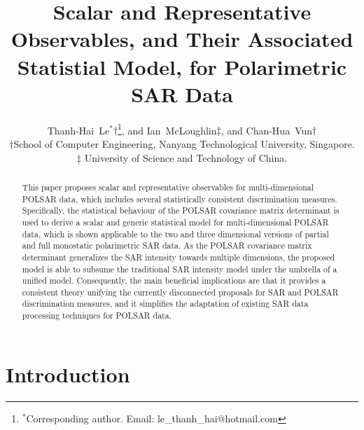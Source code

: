 \documentclass[printer]{tRSL2e}
\title{
  Scalar and Representative Observables, and Their Associated Statistial Model, for Polarimetric SAR Data
}
\begin{document}
\author{
  Thanh-Hai~Le$^{\ast}$$\dag$\thanks{$^\ast$Corresponding
author. Email: le\_thanh\_hai@hotmail.com \vspace{6pt}},
  and Ian~McLoughlin${\ddag}$, 
  and Chan-Hua~Vun${\dag}$\\
\vspace{6pt} $\dag$School of Computer Engineering, Nanyang Technological University, Singapore.\\
$\ddag$ University of Science and Technology of China.\\
\vspace{6pt} }

\maketitle

\begin{abstract}
This paper proposes scalar and representative observables for multi-dimensional POLSAR data,
  which includes several statistically consistent discrimination measures. %
Specifically, the statistical behaviour of the POLSAR covariance matrix determinant is used
  to derive a scalar and generic statistical model for multi-dimensional POLSAR data,
  which is shown applicable to the two and three dimensional versions of partial and full monostatic polarimetric SAR data.
As the POLSAR covariance matrix determinant generalizes the SAR intensity towards multiple dimensions,
  the proposed model is able to subsume the traditional SAR intensity model under the umbrella of a unified model. 
Consequently, the main beneficial implications are that %
  it provides a consistent theory unifying the currently disconnected proposals for SAR and POLSAR discrimination measures,
  and it simplifies the adaptation of existing SAR data processing techniques for POLSAR data.
\end{abstract}


\section{Introduction}
\end{document}
